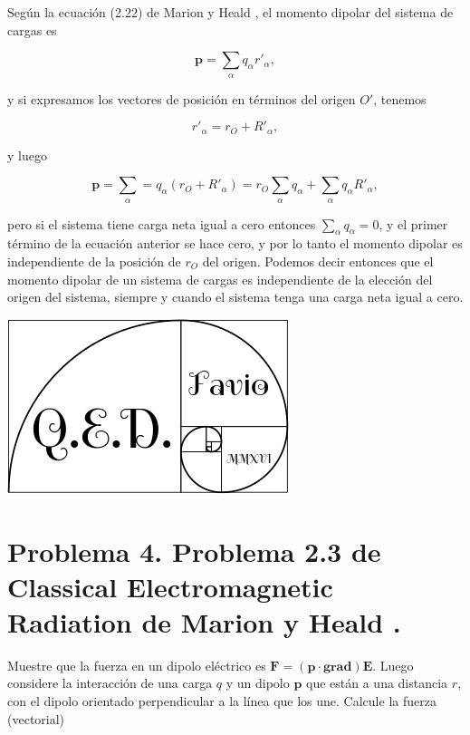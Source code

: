 \documentclass[a4paper,11pt]{article}
\numberwithin{equation}{section}
\begin{document}
Según la ecuación (2.22) de Marion y Heald \cite{marion2}, el momento dipolar del sistema 
de cargas es 

\begin{equation}
 \mathbf{p} = \sum_\alpha q_\alpha r'_\alpha,
\end{equation}

y si expresamos los vectores de posición en términos del origen $O'$, tenemos 

\begin{equation}
 r'_\alpha = r_O + R'_\alpha,
\end{equation}

y luego 

\begin{equation}
 \mathbf{p} = \sum_\alpha = q_\alpha(r_O + R'_\alpha) = r_O \sum_\alpha q_\alpha + 
 \sum_\alpha q_\alpha R'_\alpha,
\end{equation}

pero si el sistema tiene carga neta igual a cero entonces $\sum_\alpha q_\alpha = 0$, y 
el primer término de la ecuación anterior se hace cero, y por lo tanto el momento 
dipolar es independiente de la posición de $r_O$ del origen. Podemos decir 
entonces que el momento dipolar de un sistema de cargas es independiente de la elección
del origen del sistema, siempre y cuando el sistema tenga una carga neta igual a 
cero.

\hspace{10cm}\includegraphics[scale=0.25]{logoQED}

\section{Problema 4. Problema 2.3 de Classical Electromagnetic Radiation
de Marion y Heald \cite{marion2}.}

Muestre que la fuerza en un dipolo eléctrico es $\mathbf{F} = (\mathbf{p}\cdot 
\mathbf{grad})\mathbf{E}$. Luego considere la interacción de una carga $q$ y un dipolo 
$\mathbf{p}$ que están a una distancia $r$, con el dipolo orientado perpendicular a 
la línea que los une. Calcule la fuerza (vectorial)
\end{document}
